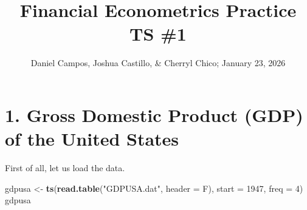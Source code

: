 \documentclass[
]{article}
\title{Financial Econometrics Practice TS \#1}
\subtitle{Daniel Campos, Joshua Castillo, \& Cherryl Chico; January 23,
2026}
\author{}
\date{\vspace{-2.5em}}
\newenvironment{Shaded}{\begin{snugshade}}{\end{snugshade}}
\newcommand{\AttributeTok}[1]{\textcolor[rgb]{0.13,0.29,0.53}{#1}}
\newcommand{\DecValTok}[1]{\textcolor[rgb]{0.00,0.00,0.81}{#1}}
\newcommand{\FunctionTok}[1]{\textcolor[rgb]{0.13,0.29,0.53}{\textbf{#1}}}
\newcommand{\NormalTok}[1]{#1}
\newcommand{\OtherTok}[1]{\textcolor[rgb]{0.56,0.35,0.01}{#1}}
\newcommand{\StringTok}[1]{\textcolor[rgb]{0.31,0.60,0.02}{#1}}
\begin{document}
\maketitle

\section{1. Gross Domestic Product (GDP) of the United
States}\label{gross-domestic-product-gdp-of-the-united-states}

First of all, let us load the data.

\begin{Shaded}
\begin{Highlighting}[]
\NormalTok{gdpusa }\OtherTok{\textless{}{-}} \FunctionTok{ts}\NormalTok{(}\FunctionTok{read.table}\NormalTok{(}\StringTok{"GDPUSA.dat"}\NormalTok{, }\AttributeTok{header =}\NormalTok{ F), }\AttributeTok{start =} \DecValTok{1947}\NormalTok{, }\AttributeTok{freq =} \DecValTok{4}\NormalTok{)}
\NormalTok{gdpusa}
\end{Highlighting}
\end{Shaded}
\end{document}
